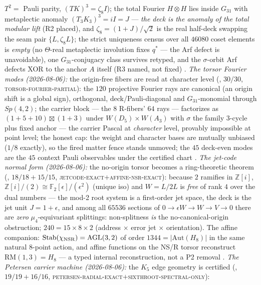 \documentclass[11pt,a4paper]{article}
\newcommand{\Z}{\mathbb{Z}}
\theoremstyle{definition}
\begin{document}
\begin{keybox}
$T^2=$ Pauli parity, $(TK)^3=\zeta_8I$); the total Fourier
$H\otimes H$ lies inside $G_{31}$ with metaplectic anomaly
$(T_3K_3)^3=iI=J$ --- \emph{the deck is the anomaly of the total
modular lift} (R2 placed), and $\zeta_8=(1{+}J)/\sqrt2$ is the
real half-deck swapping the seam pair $\{L,\zeta_8L\}$; the strict
uniqueness census over all $46080$ coset elements is \emph{empty}
(no $\Theta$-real metaplectic involution fixes $q^{*}$ --- the Arf
defect is unavoidable), one $G_{31}$-conjugacy class survives
retyped, and the $\sigma$-orbit Arf defects XOR to the anchor $A$
itself (R3 named, not fixed) \mE.
\emph{The torsor Fourier modes (2026-08-06):} the origin-free
fibers are read at character level
(, $30/30$,
\textsc{torsor-fourier-partial}): the $120$ projective Fourier
rays are canonical (an origin shift is a global sign), orthogonal,
deck/Pauli-diagonal and $G_{31}$-monomial through $Sp(4,2)$; the
carrier block --- the $8$ R-fibers' $64$ rays --- factorizes as
$(1{+}5{+}10)\boxtimes(1{+}3)$ under $W(D_5)\times W(A_3)$ with
$\sigma$ the family $3$-cycle plus fixed anchor --- the carrier
Pascal at \emph{character} level, provably impossible at point
level; the honest cap: the weight and character bases are mutually
unbiased ($1/8$ exactly), so the fired matter fence stands
unmoved; the $45$ deck-even modes are the $45$ context Pauli
observables under the certified chart \mE.
\emph{The jet-code normal form (2026-08-06):} the no-origin
torsor becomes a ring-theoretic theorem
(, $18/18+15/15$,
\textsc{jetcode-exact}$+$\textsc{affine-nsr-exact}): because $2$
ramifies in $\Z[i]$,
$\Z[i]/(2)\cong\mathbb F_2[\epsilon]/(\epsilon^2)$ (unique iso)
and $W=L/2L$ is \emph{free} of rank $4$ over the dual numbers ---
the mod-2 root system is a first-order jet space, the deck is the
jet unit $J=1{+}\epsilon$, and among all $65536$ sections of
$0\to\epsilon W\to W\to V\to0$ there are \emph{zero}
$\mu_4$-equivariant splittings: non-splitness \emph{is} the
no-canonical-origin obstruction; $240=15\times8\times2$ (address
$\times$ error jet $\times$ orientation).  The affine companion:
$\mathrm{Stab}(\chi_{\rm NSR})=\mathrm{AGL}(3,2)$ of order
$1344=|\mathrm{Aut}(H_8)|$ in the same natural 8-point action,
and affine functions on the NS/R torsor reconstruct
$\mathrm{RM}(1,3)=H_8$ --- a typed internal reconstruction, not a
P2 removal \mE.
\emph{The Petersen carrier machine (2026-08-06):} the $K_5$ edge
geometry is certified
(, $19/19+16/16$,
\textsc{petersen-radial-exact}$+$\textsc{sixthroot-spectral-only}):

\end{keybox}
\end{document}
